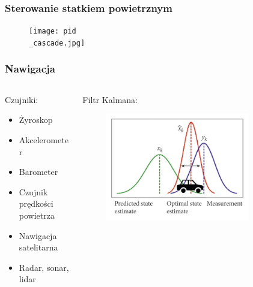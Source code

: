\documentclass[aspectratio=169]{beamer}
\begin{document}
\begin{frame}
	\frametitle{Sterowanie statkiem powietrznym}
	\begin{figure}
	   		 \centering
	      		 \texttt{[image: pid\\\_cascade.jpg]}
	\end{figure}
\end{frame}

\begin{frame}%
	\frametitle{Nawigacja}
	\begin{columns}
		\begin{column}{0.5\textwidth}
	   	 	 Czujniki:
	   	 	 \begin{itemize}
			  \item{
			    Żyroskop
			  }
			  \item {   
			    Akcelerometer
			  }
			  \item {   
			    Barometer
			  }
			  \item {   
			    Czujnik prędkości powietrza
			  }
			  \item {   
			    Nawigacja satelitarna
			  }
			  \item {   
			    Radar, sonar, lidar
			  }
	     \end{itemize}
	     \pause
	   	 	
		\end{column}
		\begin{column}{0.5\textwidth}
			Filtr Kalmana:
	   	 	\begin{figure}
	   		 \centering
	      		 \includegraphics[width=0.8\textwidth]{kalman.png}
	    		\end{figure}
		\end{column}
	\end{columns}
\end{frame}
\end{document}
